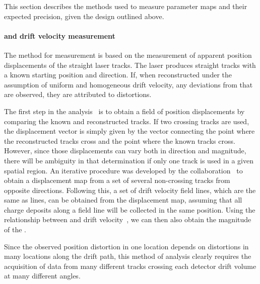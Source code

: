 




\label{sec:sp-calib-sys-las-ion-meas}

This section describes the methods used to measure 
parameter maps and their expected precision, given the design outlined above.

\paragraph{\efield and drift velocity measurement}
The method for \efield measurement is based on the measurement of apparent position displacements of the straight laser tracks. The laser produces straight tracks with a known starting position and direction. If, when reconstructed under the assumption of uniform and homogeneous drift velocity, any deviations from that are observed, they are attributed to \efield distortions. 

The first step in the analysis~\cite{bib:uBlaser2019} is to obtain a field of position displacements by comparing the known and reconstructed tracks. If two crossing tracks are used, the displacement vector is simply given by the vector connecting the point where the reconstructed tracks cross and the point where the known tracks cross. However, since those displacements can vary both in direction and magnitude, there will be ambiguity in that determination if only one track is used in a given spatial region. An iterative procedure was developed by the  collaboration~\cite{bib:chen2018,bib:uBlaser2019} to obtain a displacement map from a set of several non-crossing tracks from opposite directions. Following this, a set of drift velocity field lines, which are the same as \efield lines, can be obtained from the displacement map, assuming that all charge deposits along a field line will be collected in the same position. Using the relationship between \efield and drift velocity~\cite{Li:2015rqa,Walkowiak:2000wf}, we can then also obtain the magnitude of the \efield.

Since the observed position distortion in one location depends on \efield distortions in many locations along the drift path, this method of analysis clearly requires the acquisition of data from many different tracks crossing each detector drift volume at many different angles. 

